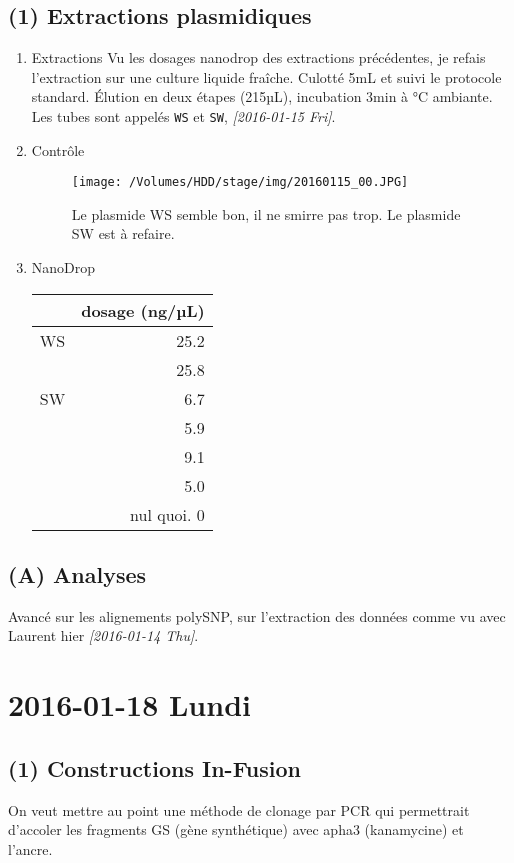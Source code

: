 \documentclass[9pt, oneside, twocolumn]{scrartcl}
\begin{document}
\subsection{(1) Extractions plasmidiques}
\label{sec:orgheadline42}
\begin{enumerate}
\item Extractions
\label{sec:orgheadline39}
Vu les dosages nanodrop des extractions précédentes, je refais l'extraction sur
une culture liquide fraîche. Culotté 5mL et suivi le protocole standard. Élution
en deux étapes (2\texttimes{}15µL), incubation 3min à °C ambiante. Les tubes sont
appelés \texttt{WS} et \texttt{SW}, \textit{[2016-01-15 Fri]}.

\item Contrôle
\label{sec:orgheadline40}

\begin{figure}[htb]
\centering
\texttt{[image: /Volumes/HDD/stage/img/20160115\_00.JPG]}
\caption{Le plasmide WS semble bon, il ne smirre pas trop. Le plasmide SW est à refaire. }
\end{figure}

\item NanoDrop
\label{sec:orgheadline41}
\begin{center}
\begin{tabular}{lr}
\toprule
 & dosage (ng/µL)\\
\midrule
WS & 25.2\\
 & 25.8\\
\midrule
SW & 6.7\\
 & 5.9\\
 & 9.1\\
 & 5.0\\
 & nul quoi. 0\\
\bottomrule
\end{tabular}
\end{center}
\end{enumerate}
\subsection{(A) Analyses}
\label{sec:orgheadline43}
Avancé sur les alignements polySNP, sur l'extraction des données comme vu avec
Laurent hier \textit{[2016-01-14 Thu]}. 

\section{2016-01-18 Lundi}
\label{sec:orgheadline46}
\subsection{(1) Constructions In-Fusion}
\label{sec:orgheadline45}
On veut mettre au point une méthode de clonage par PCR qui permettrait d'accoler
les fragments GS (gène synthétique) avec apha3 (kanamycine) et l'ancre. 
\end{document}
